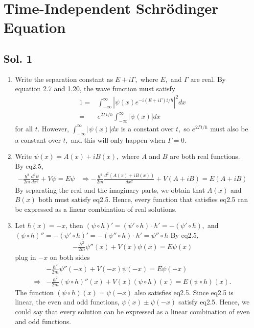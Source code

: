 \section{Time-Independent Schrödinger Equation}
\subsection*{Sol. 1}
\begin{enumerate}
    \item Write the separation constant as $E+i\Gamma,$ where $E,$ and $\Gamma$ are real. By equation 2.7 and 1.20, the wave function must satisfy
    \begin{align*}
        1 =& \int_{-\infty}^{\infty}
        |\psi(x)e^{-i(E+i\Gamma)t/\hbar}|^2dx\\
        =&e^{2\Gamma t/\hbar}\int_{-\infty}^{\infty}|\psi(x)|dx
    \end{align*}
    for all $t.$ However, $\int_{-\infty}^{\infty}|\psi(x)|dx$ is a constant over $t,$ so $e^{2\Gamma t/\hbar}$ must also be a constant over $t,$ and this will only happen when $\Gamma=0.$
    \item Write $\psi(x)=A(x)+iB(x),$ where $A$ and $B$ are both real functions. By eq2.5, 
    \begin{align*}
        -\frac{\hbar^2}{2m}\frac{d^2\psi}{dx^2}+V\psi=E\psi &\Rightarrow 
        -\frac{\hbar^2}{2m}\frac{d^2(A(x)+iB(x))}{dx^2}+V(A+iB)=E(A+iB)
    \end{align*} By separating the real and the imaginary parts, we obtain that $A(x)$ and $B(x)$ both must satisfy eq2.5. Hence, every function that satisfies eq2.5 can be expressed as a linear combination of real solutions.
    \item Let $h(x)=-x$, then $(\psi\circ h)'=(\psi'\circ h)\cdot h'=-(\psi'\circ h),$ and 
    $(\psi\circ h)'' = -(\psi'\circ h)'=-(\psi''\circ h)\cdot h'=\psi''\circ h$
    By eq2.5, 
    \begin{align*}
        -\frac{\hbar^2}{2m}\psi''(x)+V(x)\psi(x)=E\psi(x)
    \end{align*}
    plug in $-x$ on both sides
    \begin{align*}
        &-\frac{\hbar^2}{2m}\psi''(-x)+V(-x)\psi(-x)=E\psi(-x)\\
        \Rightarrow
        &-\frac{\hbar^2}{2m}(\psi\circ h)''(x)+V(x)(\psi\circ h)(x)=E(\psi\circ h)(x).
    \end{align*}
    The function $(\psi\circ h)(x)=\psi(-x)$ also satisfies eq2.5. Since eq2.5 is linear, the even and odd functions, $\psi(x)\pm \psi(-x)$ satisfy eq2.5. Hence, we could say that every solution can be expressed as a linear combination of even and odd functions.
\end{enumerate}

